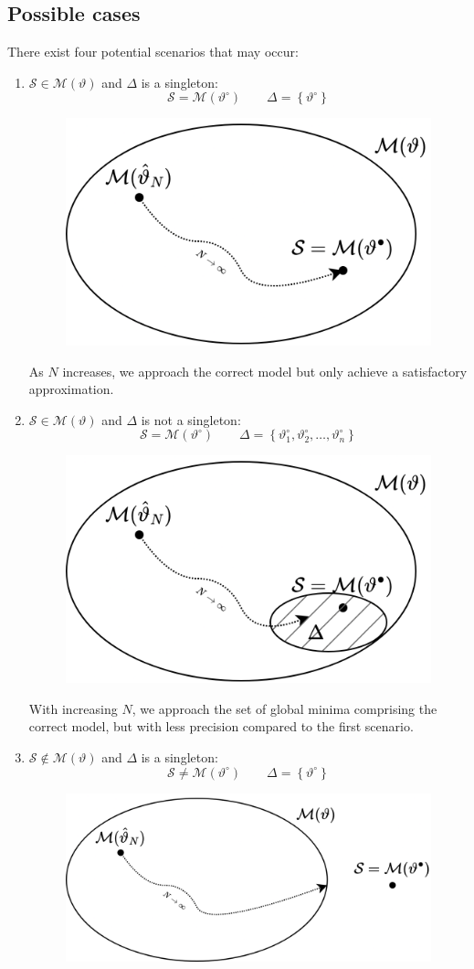 \subsection{Possible cases}
There exist four potential scenarios that may occur:
\begin{enumerate}
    \item $\mathcal{S} \in \mathcal{M}(\vartheta)$ and $\Delta$ is a singleton: 
        \[\mathcal{S}=\mathcal{M}(\vartheta^\circ)  \qquad \Delta=\left\{ \vartheta^\circ \right\}\]
        \begin{figure}[H]
            \centering
            \includegraphics[width=0.4\linewidth]{images/one.png}
        \end{figure}
        As $N$ increases, we approach the correct model but only achieve a satisfactory approximation.
    \item $\mathcal{S} \in \mathcal{M}(\vartheta)$ and $\Delta$ is not a singleton:    
        \[\mathcal{S}=\mathcal{M}(\vartheta^\circ)  \qquad \Delta=\left\{ \vartheta^\circ_1,\vartheta^\circ_2,\dots,\vartheta^\circ_n \right\}\]
        \begin{figure}[H]
            \centering
            \includegraphics[width=0.4\linewidth]{images/two.png}
        \end{figure}
        With increasing $N$, we approach the set of global minima comprising the correct model, but with less precision compared to the first scenario.
    \item $\mathcal{S} \notin \mathcal{M}(\vartheta)$ and $\Delta$ is a singleton: 
        \[\mathcal{S}\neq\mathcal{M}(\vartheta^\circ)  \qquad \Delta=\left\{ \vartheta^\circ \right\}\]
        \begin{figure}[H]
            \centering
            \includegraphics[width=0.55\linewidth]{images/three.png}

\end{figure}
\end{enumerate}
